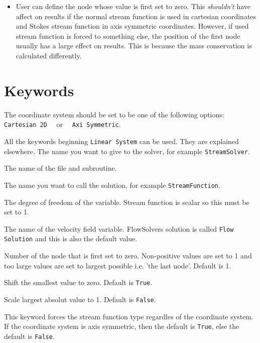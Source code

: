 \begin{versiona}
\begin{itemize}
\item User can define the node whose value is first set to zero. This \emph{shouldn't}
have affect on results if the normal stream function is used in cartesian coordinates
and Stokes stream function in axis symmetric coordinates. However, if used stream function
is forced to something else, the position of the first node usually has a large
effect on results. 
This is because the mass conservation is calculated differently.

\end{itemize}


\section{Keywords}
\end{versiona}


\sifbegin
  \sifbegin
    The coordinate system should be set to be one of the following options:
    {\tt Cartesian 2D}~~ or~~ {\tt Axi Symmetric}. 
  \sifend

  All the keywords beginning {\tt Linear System} can be used. 
  They are explained elsewhere. 
  \sifbegin
    The name you want to give to the solver, for example {\tt StreamSolver}.

    The name of the file and subroutine.

    The name you want to call the solution, for example {\tt StreamFunction}.

    The degree of freedom of the variable. Stream function is scalar so this must be set to 1.
 
    The name of the velocity field variable. FlowSolvers solution is
    called {\tt Flow Solution} and this is also the default value.

    Number of the node that is first set to zero. Non-positive values are set to 1 and
    too large values are set to largest possible i.e. 'the last node'. Default is 1.

    Shift the smallest value to zero. Default is {\tt True}.

    Scale largest absolut value to 1. Default is {\tt False}.

    This keyword forces the stream function type regardles of the coordinate system.
    If the coordinate system is axis symmetric, then the default is {\tt True},
    else the default is {\tt False}.
  \sifend
\sifend

%
%


